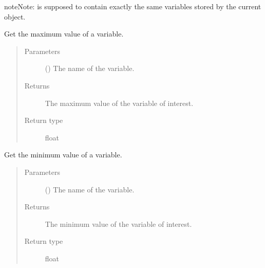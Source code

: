 \documentclass[letterpaper,10pt,english]{sphinxmanual}
\begin{document}
\begin{fulllineitems}
\begin{fulllineitems}
\begin{quote}
\begin{description}
\end{description}\end{quote}

\begin{sphinxadmonition}{note}{Note:}
 is supposed to contain exactly the same variables stored by the current object.
\end{sphinxadmonition}

\end{fulllineitems}


\begin{fulllineitems}
\label{\detokenize{api:storages.grid_data.GridData.get_max}}
Get the maximum value of a variable.
\begin{quote}\begin{description}
\item[{Parameters}] \leavevmode
{} () \textendash{} The name of the variable.

\item[{Returns}] \leavevmode
The maximum value of the variable of interest.

\item[{Return type}] \leavevmode
float

\end{description}\end{quote}

\end{fulllineitems}


\begin{fulllineitems}
\label{\detokenize{api:storages.grid_data.GridData.get_min}}
Get the minimum value of a variable.
\begin{quote}\begin{description}
\item[{Parameters}] \leavevmode
{} () \textendash{} The name of the variable.

\item[{Returns}] \leavevmode
The minimum value of the variable of interest.

\item[{Return type}] \leavevmode
float


\end{description}
\end{quote}
\end{fulllineitems}
\end{fulllineitems}
\end{document}
